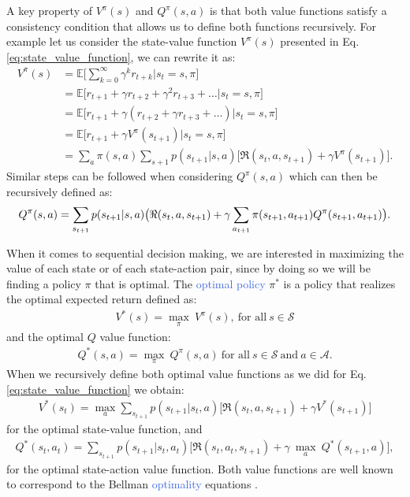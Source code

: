 A key property of $V^{\pi}(s)$ and $Q^{\pi}(s,a)$ is that both value functions satisfy a consistency condition that allows us to define both functions recursively. For example let us consider the state-value function $V^{\pi}(s)$ presented in Eq. \ref{eq:state_value_function}, we can rewrite it as:
\begin{align}
 V^{\pi}(s) & =\mathds{E}\big[\sum_{k=0}^{\infty}\gamma^{k}r_{t+k}\big| s_t = s, \pi \big] \\ 
 & =\mathds{E}\big[r_{t+1}+\gamma r_{t+2}+\gamma^{2}r_{t+3}+\ldots \big| s_t =s , \pi \big] \\ 
 & =\mathds{E}\big[r_{t+1}+\gamma(r_{t+2}+\gamma r_{t+3}+\ldots)\big| s_t =s , \pi \big] \\
 & =\mathds{E}\big[r_{t+1}+\gamma V^{\pi}(s_{t+1}) \big| s_t =s , \pi \big] \\
 & =\sum_a \pi(s,a) \sum_{s+1} p(s_{t+1}|s,a)\big[\Re(s_t, a, s_{t+1}) + \gamma V^{\pi}(s_{t+1}) \big].
\end{align}
Similar steps can be followed when considering $Q^{\pi}(s,a)$ which can then be recursively defined as:
\begin{equation}
	Q^{\pi}(s,a) = \sum_{s_{t+1}} p(s_{t+1}|s,a)\big(\Re(s_t, a, s_{t+1}) + \\ \gamma \sum_{a_{t+1}} \pi(s_{t+1},a_{t+1}) Q^{\pi}(s_{t+1}, a_{t+1}) \big).
\end{equation}

When it comes to sequential decision making, we are interested in maximizing the value of each state or of each state-action pair, since by doing so we will be finding a policy $\pi$ that is optimal. The \textcolor{RoyalBlue}{optimal policy} $\pi^{*}$ is a policy that realizes the optimal expected return defined as:
\begin{align}
 V^{*}(s)=\underset{\pi}{\max}\:V^{\pi}(s), \ \text{for all} \ s\in\mathcal{S}
\end{align}
and the optimal $Q$ value function:
\begin{align}
Q^{*}(s,a)= \underset{\pi}{\max}\:Q^{\pi}(s,a) \ \text{for all} \ s\in\mathcal{S} \ \text{and} \ a \in\mathcal{    A}.
\end{align}
When we recursively define both optimal value functions as we did for Eq. \ref{eq:state_value_function} we obtain:
\begin{align}
    V^{*}(s_t) = \underset{a}{\max}\sum_{s_{t+1}}p(s_{t+1} | s_{t}, a) \bigg[\Re (s_{t}, a, s_{t+1}) + \gamma V^{*}(s_{t+1}) \bigg]
    \label{eq:optimal_v}
\end{align}
for the optimal state-value function, and
\begin{multline}
    Q^{*}(s_t,a_t)=\sum_{s_{t+1}}p(s_{t+1} | s_{t}, a_{t})  \bigg[\Re (s_{t}, a_{t}, s_{t+1}) + \gamma \: \underset{a}{\max} \: Q^{*}(s_{t+1}, a) \bigg],
    \label{eq:optimal_q}
\end{multline}
for the optimal state-action value function. Both value functions are well known to correspond to the Bellman \textcolor{RoyalBlue}{optimality} equations \cite{bellman1966dynamic}. 

